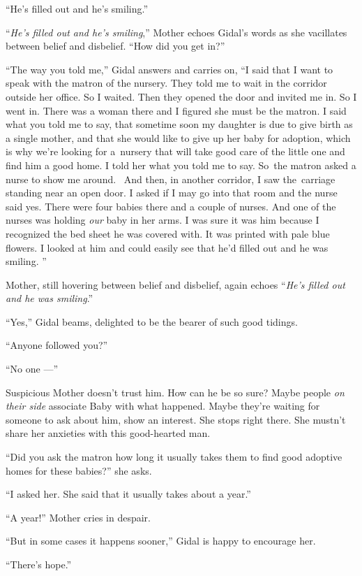\documentclass[twoside,11pt,openany]{book}
\begin{document}
``He's filled out and he's smiling.''

``\textit{He's filled out and he{'}s smiling},'' Mother echoes Gidal's words as
she vacillates between belief and disbelief. ``How did you get in?''

``The way you told me,'' Gidal answers and carries on, ``I said that I want to
speak with the matron of the nursery. They told me to wait in the corridor outside her office. So I waited. Then they
opened the door and invited me in. So I went in. There was a woman there and I figured she must be the matron. I said
what you told me to say, that sometime soon my daughter is due to give birth as a single mother, and that she would
like to give up her baby for adoption, which is why we're looking for a~nursery that will take good care of the little
one and find him a good home. I told her what you told me to say. So~the matron asked a nurse to show me around.~ And
then, in another corridor, I saw the~carriage standing near an open door. I asked if I may go into that room and the
nurse said yes. There were four babies there and a couple of nurses. And one of the nurses was holding\textit{ our
}baby in her arms. I was sure it was him because I recognized the bed sheet he was covered with. It was printed with
pale blue flowers. I looked at him and could easily see that he'd filled out and he was smiling. ''

Mother, still hovering between belief and disbelief, again{ }echoes
``\textit{He's filled out and he was smiling}.''

``Yes,'' Gidal beams, delighted to be the bearer of such good tidings.

``Anyone followed you?''

``No one ---''

Suspicious{ }Mother doesn't trust him. How can he be so sure? Maybe people
\textit{on their side} associate Baby with what happened. Maybe they're waiting for someone to ask about him, show an
interest. She stops right there. She mustn't share her anxieties with this good-hearted man.

``Did you ask the matron how long it usually takes them to find good adoptive homes for these
babies?'' she asks.

``I asked her. She said that it usually takes about a year.''

``A year!'' Mother cries in despair.

``But in some cases it happens sooner,'' Gidal is happy to encourage her.

``There's hope.''
\end{document}
